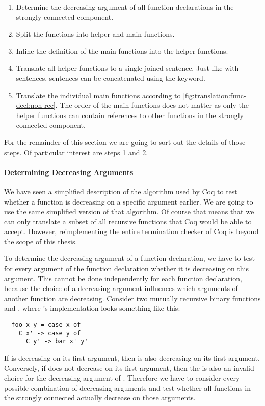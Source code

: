 \begin{enumerate}
  \item
  Determine the decreasing argument of all function declarations in the strongly connected component.
  \item
  Split the functions into helper and main functions.
  \item
  Inline the definition of the main functions into the helper functions.
  \item
  Translate all helper functions to a single joined  sentence.
  Just like with  sentences,  sentences can be concatenated using the  keyword.
  \item
  Translate the individual main functions according to \autoref{fig:translation:func-decl:non-rec}.
  The order of the main functions does not matter as only the helper functions can contain references to other functions in the strongly connected component.
\end{enumerate}

For the remainder of this section we are going to sort out the details of those steps.
Of particular interest are steps 1 and 2.

\paragraph{Determining Decreasing Arguments}
We have seen a simplified description of the algorithm used by Coq to test whether a function is decreasing on a specific argument earlier.
We are going to use the same simplified version of that algorithm.
Of course that means that we can only translate a subset of all recursive functions that Coq would be able to accept.
However, reimplementing the entire termination checker of Coq is beyond the scope of this thesis.

To determine the decreasing argument of a function declaration, we have to test for every argument of the function declaration whether it is decreasing on this argument.
This cannot be done independently for each function declaration, because the choice of a decreasing argument influences which arguments of another function are decreasing.
Consider two mutually recursive binary functions  and , where 's implementation looks something like this:
\begin{verbatim}
  foo x y = case x of
    C x' -> case y of
      C y' -> bar x' y'
\end{verbatim}
If  is decreasing on its first argument, then  is also decreasing on its first argument.
Conversely, if  does not decrease on its first argument, then the  is also an invalid choice for the decreasing argument of .
Therefore we have to consider every possible combination of decreasing arguments and test whether all functions in the strongly connected actually decrease on those arguments.

